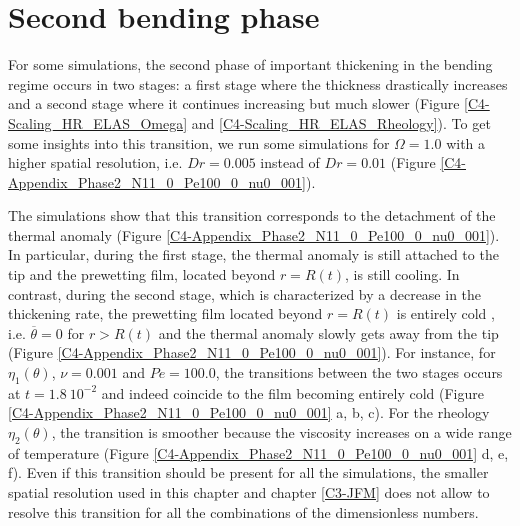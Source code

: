 \section{Second bending phase}
\label{C4-Heat:AppendixC}

For some simulations, the second  phase of important thickening in the
bending regime occurs in two stages: a first stage where the thickness
drastically increases and a second stage where it continues increasing
but   much    slower   (Figure    \ref{C4-Scaling_HR_ELAS_Omega}   and
\ref{C4-Scaling_HR_ELAS_Rheology}).   To get  some insights  into this
transition, we  run some  simulations for  $\Omega=1.0$ with  a higher
spatial  resolution, i.e.   $Dr=0.005$  instead  of $Dr=0.01$  (Figure
\ref{C4-Appendix_Phase2_N11_0_Pe100_0_nu0_001}).

The  simulations   show  that  this  transition   corresponds  to  the
detachment       of       the      thermal       anomaly       (Figure
\ref{C4-Appendix_Phase2_N11_0_Pe100_0_nu0_001}).     In    particular,
during the first  stage, the thermal anomaly is still  attached to the
tip  and  the  prewetting  film, located  beyond  $r=R(t)$,  is  still
cooling.  In contrast, during the second stage, which is characterized
by  a decrease  in the  thickening rate,  the prewetting  film located
beyond $r=R(t)$  is entirely cold  , i.e.  $\overline{\theta}  =0$ for
$r>R(t)$ and the thermal anomaly slowly gets away from the tip (Figure
\ref{C4-Appendix_Phase2_N11_0_Pe100_0_nu0_001}).   For  instance,  for
$\eta_1(\theta)$, $\nu=0.001$ and  $Pe=100.0$, the transitions between
the two  stages occurs at  $t=1.8~10^{-2}$ and indeed coincide  to the
film          becoming          entirely         cold          (Figure
\ref{C4-Appendix_Phase2_N11_0_Pe100_0_nu0_001}  a,  b,  c).   For  the
rheology  $\eta_2(\theta)$, the  transition  is  smoother because  the
viscosity   increases  on   a  wide   range  of   temperature  (Figure
\ref{C4-Appendix_Phase2_N11_0_Pe100_0_nu0_001} d, e,  f). Even if this
transition  should be  present for  all the  simulations, the  smaller
spatial resolution used in this  chapter and chapter \ref{C3-JFM} does
not allow to  resolve this transition for all the  combinations of the
dimensionless numbers.


